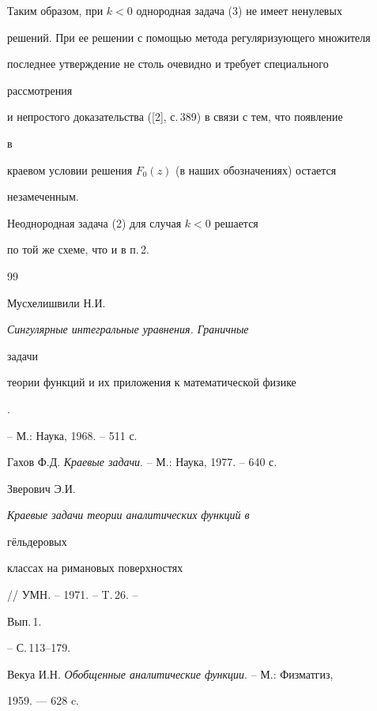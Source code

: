  


Таким образом, при $k<0$ однородная задача (3) не имеет ненулевых 


решений. При ее решении с помощью метода регуляризующего множителя 


последнее утверждение не столь очевидно и требует специального 


рассмотрения 


и непростого доказательства ([2], с.\,389) в связи с тем, что появление 


в 


краевом условии решения $F_0(z)$ (в наших обозначениях) остается 


незамеченным. 


 


Неоднородная задача (2) для случая $k<0$ решается 


по той же схеме, что и в п.\,2. 


 


\begin{thebibliography}{99} 


 




Мусхелишвили Н.И. {\em Сингулярные интегральные уравнения. Граничные 


задачи 


теории функций и их приложения к математической физике}. 


-- М.: Наука, 1968. -- 511 с. 




Гахов Ф.Д. {\em Краевые задачи}. -- М.: Наука, 1977. -- 640 с. 




Зверович Э.И. {\em Краевые задачи теории аналитических функций в 


г\"ельдеровых 


классах на римановых поверхностях} // УМН. -- 1971. -- T.\,26. -- 


Вып.\,1. 


-- С.\,113--179. 




Векуа И.Н. {\em Обобщенные аналитические функции}. -- М.: Физматгиз, 


1959. --- 628 c. 


 


\end{thebibliography} 


 


\vskip 2cm 


 








 


\label{end} 


 


